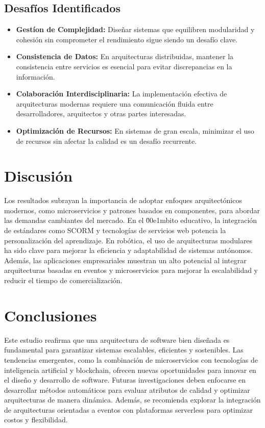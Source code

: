 \documentclass[conference]{IEEEtran}
\begin{document}
\subsection{Desaf\'ios Identificados}
\begin{itemize}
    \item \textbf{Gest\'ion de Complejidad:} Dise\~nar sistemas que equilibren modularidad y cohesi\'on sin comprometer el rendimiento sigue siendo un desaf\'io clave.
    \item \textbf{Consistencia de Datos:} En arquitecturas distribuidas, mantener la consistencia entre servicios es esencial para evitar discrepancias en la informaci\'on.
    \item \textbf{Colaboraci\'on Interdisciplinaria:} La implementaci\'on efectiva de arquitecturas modernas requiere una comunicaci\'on fluida entre desarrolladores, arquitectos y otras partes interesadas.
    \item \textbf{Optimizaci\'on de Recursos:} En sistemas de gran escala, minimizar el uso de recursos sin afectar la calidad es un desaf\'io recurrente.
\end{itemize}

\section{Discusi\'on}
Los resultados subrayan la importancia de adoptar enfoques arquitect\'onicos modernos, como microservicios y patrones basados en componentes, para abordar las demandas cambiantes del mercado. En el \u00e1mbito educativo, la integraci\'on de est\'andares como SCORM y tecnolog\'ias de servicios web potencia la personalizaci\'on del aprendizaje. En rob\'otica, el uso de arquitecturas modulares ha sido clave para mejorar la eficiencia y adaptabilidad de sistemas aut\'onomos. Adem\'as, las aplicaciones empresariales muestran un alto potencial al integrar arquitecturas basadas en eventos y microservicios para mejorar la escalabilidad y reducir el tiempo de comercializaci\'on.

\section{Conclusiones}
Este estudio reafirma que una arquitectura de software bien dise\~nada es fundamental para garantizar sistemas escalables, eficientes y sostenibles. Las tendencias emergentes, como la combinaci\'on de microservicios con tecnolog\'ias de inteligencia artificial y blockchain, ofrecen nuevas oportunidades para innovar en el dise\~no y desarrollo de software. Futuras investigaciones deben enfocarse en desarrollar m\'etodos autom\'aticos para evaluar atributos de calidad y optimizar arquitecturas de manera din\'amica. Adem\'as, se recomienda explorar la integraci\'on de arquitecturas orientadas a eventos con plataformas serverless para optimizar costos y flexibilidad.
\end{document}
